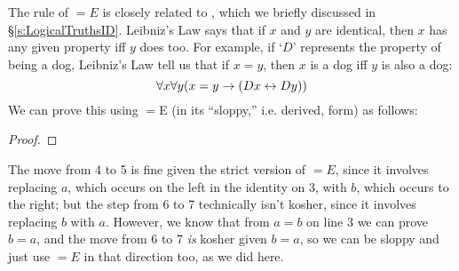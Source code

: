 The rule of $=E$ is closely related to , which we briefly discussed in \S\ref{s:LogicalTruthsID}. Leibniz's Law says that if $x$ and $y$ are identical, then $x$ has any given property  iff $y$ does too. For example, if `$D$' represents the property of being a dog, Leibniz's Law tell us that if $x=y$, then $x$ is a dog iff $y$ is also a dog:
$$\forall x \forall y (x = y \rightarrow (Dx \leftrightarrow Dy))$$
We can prove this using $=$E (in its ``sloppy,'' i.e. derived, form) as follows:

\begin{proof}
\open
	 \fl{}
	\open
		 \fl{}
		\open
			 
			\open
				 
			\close
			\open
				 
				 
			\close
		 
		\close
	 
	\close
	 
	\close
	 

\end{proof}
The move from 4 to 5 is fine given the strict version of $=E$, since it involves replacing $a$, which occurs on the left in the identity on 3, with $b$, which occurs to the right; but the step from 6 to 7 technically isn't kosher, since it involves replacing $b$ with $a$.  However, we know that from $a=b$ on line 3 we can prove $b=a$, and the move from 6 to 7 \emph{is} kosher given $b=a$, so we can be sloppy and just use $=E$ in that direction too, as we did here.







